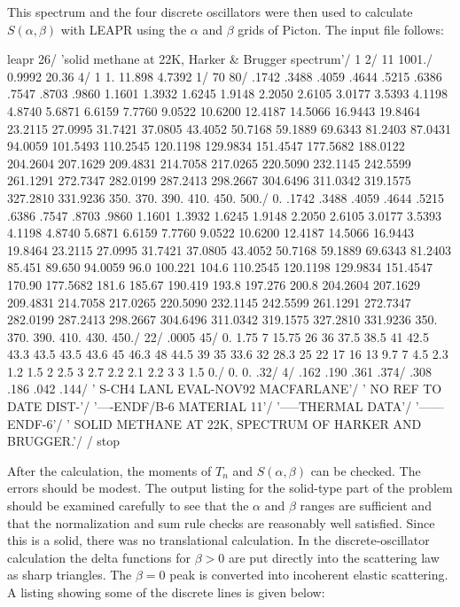 This spectrum and the four discrete oscillators were then used to
calculate $S(\alpha,\beta)$ with LEAPR using the $\alpha$ and $\beta$
grids of Picton.  The input file follows:

\small
\begin{ccode}

leapr
26/
'solid methane at 22K, Harker & Brugger spectrum'/
 1 2/
 11 1001./
 0.9992 20.36 4/
 1 1. 11.898 4.7392 1/
 70 80/
 .1742 .3488 .4059 .4644 .5215 .6386 .7547 .8703
   .9860 1.1601 1.3932 1.6245 1.9148 2.2050 2.6105
   3.0177 3.5393 4.1198 4.8740 5.6871 6.6159 7.7760
   9.0522 10.6200 12.4187 14.5066 16.9443 19.8464 23.2115
   27.0995 31.7421 37.0805 43.4052 50.7168 59.1889 69.6343
   81.2403 87.0431 94.0059 101.5493 110.2545 120.1198 129.9834
   151.4547 177.5682 188.0122 204.2604 207.1629 209.4831 214.7058
   217.0265 220.5090 232.1145 242.5599 261.1291 272.7347 282.0199
   287.2413 298.2667 304.6496 311.0342 319.1575 327.2810 331.9236
   350. 370. 390. 410. 450. 500./
 0. .1742 .3488 .4059 .4644 .5215 .6386 .7547 .8703
   .9860 1.1601 1.3932 1.6245 1.9148 2.2050 2.6105
   3.0177 3.5393 4.1198 4.8740 5.6871 6.6159 7.7760
   9.0522 10.6200 12.4187 14.5066 16.9443 19.8464 23.2115
   27.0995 31.7421 37.0805 43.4052 50.7168 59.1889 69.6343
   81.2403 85.451 89.650 94.0059 96.0 100.221 104.6 110.2545
   120.1198 129.9834 151.4547 170.90 177.5682 181.6 185.67 190.419
   193.8 197.276 200.8 204.2604 207.1629 209.4831 214.7058
   217.0265 220.5090 232.1145 242.5599 261.1291 272.7347 282.0199
   287.2413 298.2667 304.6496 311.0342 319.1575 327.2810 331.9236
   350. 370. 390. 410. 430. 450./
 22/
 .0005 45/
 0. 1.75 7 15.75 26 36 37.5 38.5 41 42.5 43.3 43.5
  43.5 43.6 45 46.3 48 44.5 39 35 33.6 32 28.3 25 22 17 16
  13 9.7 7 4.5 2.3 1.2 1.5 2 2.5 3 2.7 2.2 2.1 2.2 3 3 1.5
  0./
 0. 0. .32/
 4/
 .162 .190 .361 .374/
 .308 .186 .042 .144/
' S-CH4     LANL       EVAL-NOV92 MACFARLANE'/
' NO REF TO DATE       DIST-'/
'----ENDF/B-6          MATERIAL 11'/
'-----THERMAL DATA'/
'------ENDF-6'/
' SOLID METHANE AT 22K, SPECTRUM OF HARKER AND BRUGGER.'/
/
stop

\end{ccode}
\normalsize

After the calculation, the moments of $T_n$ and $S(\alpha,\beta)$ can be
checked.  The errors should be modest.  The output listing for the
solid-type part of the problem should be examined carefully to see that the
$\alpha$ and $\beta$ ranges are sufficient and that the normalization
and sum rule checks are reasonably well satisfied.   Since this is a
solid, there was no translational calculation.  In the discrete-oscillator
calculation the delta functions for $\beta>0$ are put directly into the
scattering law as sharp triangles.  The $\beta{=}0$ peak is converted
into incoherent elastic scattering.   A listing showing some of the
discrete lines is given below:

